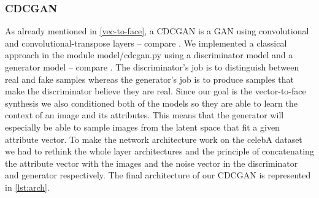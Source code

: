 \documentclass[12pt, a4paper]{article}
\begin{document}
\subsubsection{CDCGAN}
As already mentioned in \ref{vec-to-face}, a CDCGAN is a GAN using convolutional and convolutional-transpose layers
-- compare \cite{dcgan}.
We implemented a classical approach in the module model/cdcgan.py using a discriminator model and a generator model --
compare \cite{gan}.
The discriminator's job is to distinguish between real and fake samples whereas the generator's job is to produce samples
that make the discriminator believe they are real.
Since our goal is the vector-to-face synthesis we also conditioned both of the models so they are able to learn the
context of an image and its attributes.
This means that the generator will especially be able to sample images from the latent space that fit a given attribute vector.
To make the network architecture work on the celebA dataset we had to rethink the whole layer architectures and the
principle of concatenating the attribute vector with the images and the noise vector in the discriminator and generator
respectively.
The final architecture of our CDCGAN is represented in \ref{lst:arch}.
\end{document}
